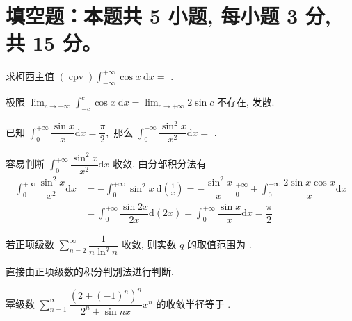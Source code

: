\section{填空题：本题共 5 小题, 每小题 3 分, 共 15 分。}



\begin{question}
求柯西主值 $\displaystyle (\operatorname{cpv})\int_{-\infty}^{+\infty} \cos x ~ \mathrm{d}x =$ \fillin[发散].
\end{question}

\begin{solution}
极限 $\displaystyle \lim_{c\to+\infty} \int_{-c}^{c} \cos x ~ \mathrm{d}x = \lim_{c\to+\infty} 2\sin c$ 不存在, 发散.
\end{solution}

\begin{question}
已知 $\displaystyle \int_0^{+\infty} \dfrac{\sin x}{x} \mathrm{d}x = \dfrac{\pi}{2},$ 那么 $\displaystyle \int_0^{+\infty} \dfrac{\sin^2 x}{x^2} \mathrm{d}x =$ \fillin[$\dfrac{\pi}{2}$].
\end{question}

\begin{solution}
容易判断 $\displaystyle \int_0^{+\infty} \dfrac{\sin^2 x}{x^2} \mathrm{d}x$ 收敛. 由分部积分法有
\begin{align*}
\int_0^{+\infty} \dfrac{\sin^2 x}{x^2} \mathrm{d}x & = - \int_0^{+\infty} \sin^2 x ~\mathrm{d} \left(\frac{1}{x}\right) = - \dfrac{\sin^2 x}{x} \bigg|_0^{+\infty} + \int_0^{+\infty} \dfrac{2\sin x \cos x}{x} \mathrm{d}x \\
& = \int_0^{+\infty} \dfrac{\sin 2x}{2x} \mathrm{d}(2x) = \int_0^{+\infty} \dfrac{\sin x}{x} \mathrm{d}x = \dfrac{\pi}{2}
\end{align*}
\end{solution}

\begin{question}
若正项级数 $\displaystyle \sum_{n=2}^\infty \dfrac{1}{n \ln^q n}$ 收敛, 则实数 $q$ 的取值范围为 \fillin[$q > 1$].
\end{question}

\begin{solution}
直接由正项级数的积分判别法进行判断.
\end{solution}

\begin{question}
幂级数 $\displaystyle \sum\limits_{n=1}^{\infty} \dfrac{\left( 2 + (-1)^n \right)^n}{2^n + \sin nx} x^n$ 的收敛半径等于 \fillin[$\dfrac{2}{3}$].
\end{question}

